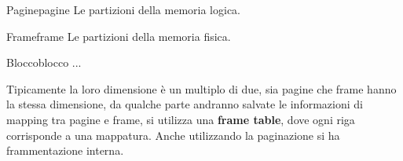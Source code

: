 \documentclass[12pt]{article}
\begin{document}
\begin{definition}{Pagine}{pagine}
  Le partizioni della memoria logica.
\end{definition}
\begin{definition}{Frame}{frame}
  Le partizioni della memoria fisica.
\end{definition}
\begin{definition}{Blocco}{blocco}
  ...
\end{definition}
Tipicamente la loro dimensione \`e un multiplo di due, sia pagine che frame hanno la stessa dimensione, da qualche parte andranno salvate le informazioni di mapping tra pagine e frame, si utilizza una \textbf{frame table}, dove ogni riga corrisponde a una mappatura. Anche utilizzando la paginazione si ha frammentazione interna. 

\hfill
\end{document}
